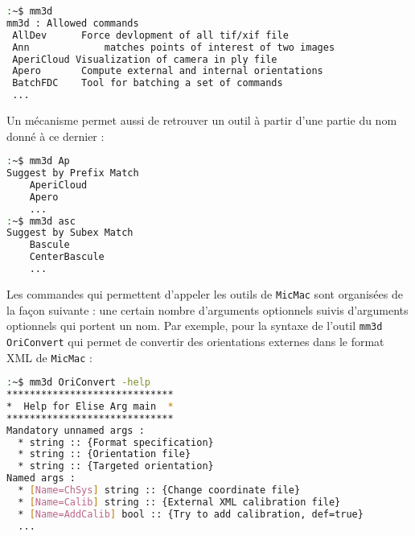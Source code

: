 \documentclass[a4paper,10pt]{article} %
\begin{document}
\begin{lstlisting}[language=bash]
:~$ mm3d
mm3d : Allowed commands 
 AllDev		 Force devlopment of all tif/xif file
 Ann	 		 matches points of interest of two images
 AperiCloud	Visualization of camera in ply file
 Apero	 	 Compute external and internal orientations
 BatchFDC	 Tool for batching a set of commands
 ...
\end{lstlisting}

Un mécanisme permet aussi de retrouver un outil à partir d'une partie du nom donné à ce dernier :

\begin{lstlisting}[language=bash]
:~$ mm3d Ap
Suggest by Prefix Match
    AperiCloud
    Apero
    ...
:~$ mm3d asc
Suggest by Subex Match
    Bascule
    CenterBascule
    ...
\end{lstlisting}

Les commandes qui permettent d'appeler les outils de {\tt MicMac} sont organisées de la façon suivante : une certain nombre d'arguments optionnels suivis d'arguments optionnels qui portent un nom. Par exemple, pour la syntaxe de l'outil {\tt mm3d OriConvert} qui permet de convertir des orientations externes dans le format XML de {\tt MicMac} :
\begin{lstlisting}[language=bash]
:~$ mm3d OriConvert -help
*****************************
*  Help for Elise Arg main  *
*****************************
Mandatory unnamed args : 
  * string :: {Format specification}
  * string :: {Orientation file}
  * string :: {Targeted orientation}
Named args : 
  * [Name=ChSys] string :: {Change coordinate file}
  * [Name=Calib] string :: {External XML calibration file}
  * [Name=AddCalib] bool :: {Try to add calibration, def=true}
  ...
\end{lstlisting}
\end{document}
